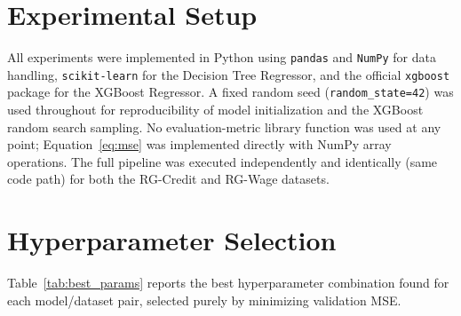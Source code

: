 \documentclass[11pt]{article}
\begin{document}
\section{Experimental Setup}
All experiments were implemented in Python using \texttt{pandas} and \texttt{NumPy} for data handling, \texttt{scikit-learn} for the Decision Tree Regressor, and the official \texttt{xgboost} package for the XGBoost Regressor. A fixed random seed (\texttt{random\_state=42}) was used throughout for reproducibility of model initialization and the XGBoost random search sampling. No evaluation-metric library function was used at any point; Equation~\ref{eq:mse} was implemented directly with NumPy array operations. The full pipeline was executed independently and identically (same code path) for both the RG-Credit and RG-Wage datasets.

\section{Hyperparameter Selection}
Table~\ref{tab:best_params} reports the best hyperparameter combination found for each model/dataset pair, selected purely by minimizing validation MSE.

\begin{table}[H]
\centering
\caption{Best hyperparameters selected on the validation set.}
\label{tab:best_params}
\end{table}
\end{document}
